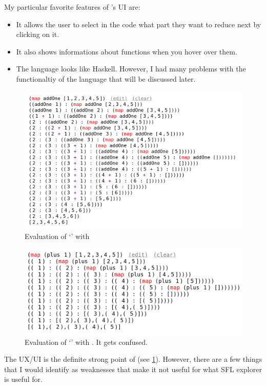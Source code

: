 My particular favorite features of \llessons's UI are:

\begin{itemize}
    \item It allows the user to select in the code what part they want to reduce next by clicking on it. 
    \item It also shows informations about functions when you hover over them. 
    \item The language looks like Haskell. However, I had many problems with the functionaltiy of the language that will be discussed later. 
\end{itemize}


\begin{figure}[h]
    \centering
    \includegraphics[width=0.75\linewidth]{images/LLessonsMap.png}
    \caption{Evaluation of `' with \llessons}
    \label{bg:llessons_ui}
\end{figure}

\begin{figure}[h]
    \centering
    \includegraphics[width=0.75\linewidth]{images/LLessonsGoingWrong.png}
    \caption{Evaluation of `' with \llessons. It gets confused. }
    \label{bg:llessons_gets_confused}
\end{figure}

The UX/UI is the definite strong point of \llessons (see \ref{bg:llessons_ui}).  However, there are a few things that I would identify as weaknesses that make it not useful for what SFL explorer is useful for. 

